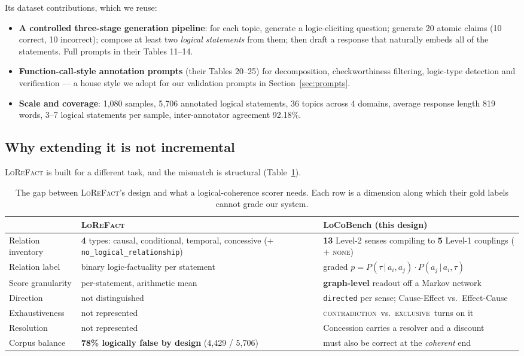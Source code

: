 \documentclass[11pt]{article}
\newcommand{\cCon}{\textsc{contradiction}}
\newcommand{\cExc}{\textsc{exclusive}}
\newcommand{\cNone}{\textsc{none}}
\begin{document}
Its dataset contributions, which we reuse:

\begin{itemize}[leftmargin=*,nosep]
  \item \textbf{A controlled three-stage generation pipeline}: for each topic, generate a
        logic-eliciting question; generate 20 atomic claims (10 correct, 10 incorrect);
        compose at least two \emph{logical statements} from them; then draft a response that
        naturally embeds all of the statements. Full prompts in their Tables 11--14.
  \item \textbf{Function-call-style annotation prompts} (their Tables 20--25) for
        decomposition, checkworthiness filtering, logic-type detection and verification ---
        a house style we adopt for our validation prompts in Section~\ref{sec:prompts}.
  \item \textbf{Scale and coverage}: 1{,}080 samples, 5{,}706 annotated logical statements,
        36 topics across 4 domains, average response length 819 words, 3--7 logical
        statements per sample, inter-annotator agreement 92.18\%.
\end{itemize}

\subsection{Why extending it is not incremental}

\textsc{LoReFact} is built for a different task, and the mismatch is structural
(Table~\ref{tab:gap}).

\begin{table}[h]\centering\small
\renewcommand{\arraystretch}{1.15}
\begin{tabular}{@{}p{3.5cm}p{5.1cm}p{5.6cm}@{}}
\toprule
 & \textbf{\textsc{LoReFact}} & \textbf{LoCoBench (this design)}\\
\midrule
Relation inventory & \textbf{4} types: causal, conditional, temporal, concessive
  ($+$ \texttt{no\_logical\_relationship}) & \textbf{13} Level-2 senses compiling to
  \textbf{5} Level-1 couplings ($+$ \cNone)\\
Relation label & binary logic-factuality per statement &
  graded $p=P(\tau\,|\,a_i,a_j)\cdot P(a_j\,|\,a_i,\tau)$\\
Score granularity & per-statement, arithmetic mean &
  \textbf{graph-level} readout off a Markov network\\
Direction & not distinguished & \texttt{directed} per sense; Cause-Effect vs.\ Effect-Cause\\
Exhaustiveness & not represented & \cCon\ vs.\ \cExc\ turns on it\\
Resolution & not represented & Concession carries a resolver and a discount\\
Corpus balance & \textbf{78\% logically false by design} (4{,}429 / 5{,}706) &
  must also be correct at the \emph{coherent} end\\
\bottomrule
\end{tabular}
\caption{The gap between \textsc{LoReFact}'s design and what a logical-coherence scorer needs.
Each row is a dimension along which their gold labels cannot grade our system.}
\label{tab:gap}
\end{table}
\end{document}
